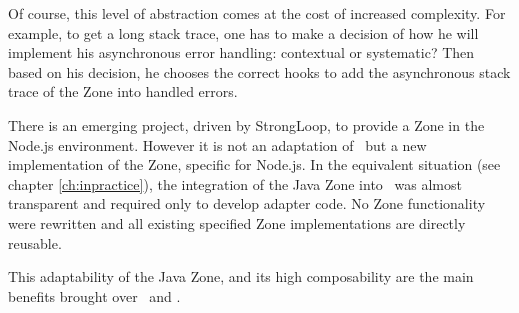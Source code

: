 Of course, this level of abstraction comes at the cost of increased complexity. For example, to get a long stack trace, one has to make a decision of how he will implement his asynchronous error handling: contextual or systematic? Then based on his decision, he chooses the correct hooks to add the asynchronous stack trace of the Zone into handled errors.

There is an emerging project, driven by StrongLoop, to provide a Zone in the Node.js environment. However it is not an adaptation of \zonejs\ but a new implementation of the Zone, specific for Node.js. In the equivalent situation (see chapter \ref{ch:inpractice}), the integration of the Java Zone into \vertx\ was almost transparent and required only to develop adapter code. No Zone functionality were rewritten and all existing specified Zone implementations are directly reusable.

This adaptability of the Java Zone, and its high composability are the main benefits brought over \zonejs\ and \zonedrt.
